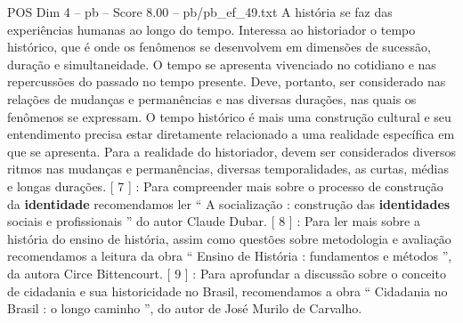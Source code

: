 \begin{textsample}{POS Dim 4 – pb – Score 8.00 – pb/pb\_ef\_49.txt}
A história se faz das experiências humanas ao longo do tempo.
Interessa ao historiador o tempo histórico, que é onde os fenômenos se desenvolvem em dimensões de sucessão, duração e simultaneidade.
O tempo se apresenta vivenciado no cotidiano e nas repercussões do passado no tempo presente.
Deve, portanto, ser considerado nas relações de mudanças e permanências e nas diversas durações, nas quais os fenômenos se expressam.
O tempo histórico é mais uma construção cultural e seu entendimento precisa estar diretamente relacionado a uma realidade específica em que se apresenta.
Para a realidade do historiador, devem ser considerados diversos ritmos nas mudanças e permanências, diversas temporalidades, as curtas, médias e longas durações. [ 7 ] : Para compreender mais sobre o processo de construção da \textbf{identidade} recomendamos ler “ A socialização : construção das \textbf{identidades} sociais e profissionais ” do autor Claude Dubar. [ 8 ] : Para ler mais sobre a história do ensino de história, assim como questões sobre metodologia e avaliação recomendamos a leitura da obra “ Ensino de História : fundamentos e métodos ”, da autora Circe Bittencourt. [ 9 ] : Para aprofundar a discussão sobre o conceito de cidadania e sua historicidade no Brasil, recomendamos a obra “ Cidadania no Brasil : o longo caminho ”, do autor de José Murilo de Carvalho.

\end{textsample}
